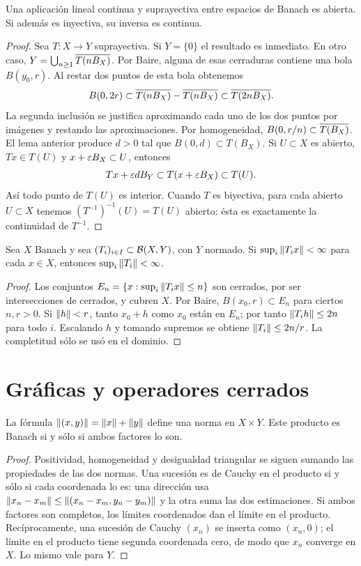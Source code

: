 \begin{teorema}\label{v3:abierta}
Una aplicación lineal continua y suprayectiva entre espacios de Banach es abierta. Si además es inyectiva, su inversa es continua.
\end{teorema}
\begin{proof}
Sea $T:X\to Y$ suprayectiva. Si $Y=\{0\}$ el resultado es inmediato. En otro caso,
$Y=\bigcup_{n\ge1}\overline{T(nB_X)}$. Por Baire, alguna de esas cerraduras contiene una bola $B(y_0,r)$. Al restar dos puntos de esta bola obtenemos
\[B(0,2r)\subset\overline{T(nB_X)}-\overline{T(nB_X)}
\subset\overline{T(2nB_X)}.
\]
La segunda inclusión se justifica aproximando cada uno de los dos puntos por imágenes y restando las aproximaciones. Por homogeneidad,
$B(0,r/n)\subset\overline{T(B_X)}$. El lema anterior produce $d>0$ tal que $B(0,d)\subset T(B_X)$. Si $U\subset X$ es abierto, $Tx\in T(U)$ y $x+\varepsilon B_X\subset U$, entonces
\[Tx+\varepsilon d B_Y\subset T(x+\varepsilon B_X)\subset T(U).
\]
Así todo punto de $T(U)$ es interior. Cuando $T$ es biyectiva, para cada abierto $U\subset X$ tenemos $(T^{-1})^{-1}(U)=T(U)$ abierto: ésta es exactamente la continuidad de $T^{-1}$.
\end{proof}

\begin{teorema}\label{v3:acotacion-uniforme}
Sea $X$ Banach y sea $(T_i)_{i\in I}\subset\mathcal B(X,Y)$, con $Y$ normado. Si $\sup_i\left\lVert T_i x\right\rVert<\infty$ para cada $x\in X$, entonces $\sup_i\left\lVert T_i\right\rVert<\infty$.
\end{teorema}
\begin{proof}
Los conjuntos $E_n=\{x:\sup_i\left\lVert T_ix\right\rVert\le n\}$ son cerrados, por ser intersecciones de cerrados, y cubren $X$. Por Baire, $B(x_0,r)\subset E_n$ para ciertos $n,r>0$. Si $\left\lVert h\right\rVert<r$, tanto $x_0+h$ como $x_0$ están en $E_n$; por tanto $\left\lVert T_i h\right\rVert\le2n$ para todo $i$. Escalando $h$ y tomando supremos se obtiene $\left\lVert T_i\right\rVert\le2n/r$. La completitud sólo se usó en el dominio.
\end{proof}

\section{Gráficas y operadores cerrados}
\begin{proposicion}\label{v3:producto-banach}
La fórmula $\left\lVert(x,y)\right\rVert=\left\lVert x\right\rVert+\left\lVert y\right\rVert$ define una norma en $X\times Y$. Este producto es Banach si y sólo si ambos factores lo son.
\end{proposicion}
\begin{proof}
Positividad, homogeneidad y desigualdad triangular se siguen sumando las propiedades de las dos normas. Una sucesión es de Cauchy en el producto si y sólo si cada coordenada lo es: una dirección usa $\left\lVert x_n-x_m\right\rVert\le\left\lVert(x_n-x_m,y_n-y_m)\right\rVert$ y la otra suma las dos estimaciones. Si ambos factores son completos, los límites coordenados dan el límite en el producto. Recíprocamente, una sucesión de Cauchy $(x_n)$ se inserta como $(x_n,0)$; el límite en el producto tiene segunda coordenada cero, de modo que $x_n$ converge en $X$. Lo mismo vale para $Y$.
\end{proof}

